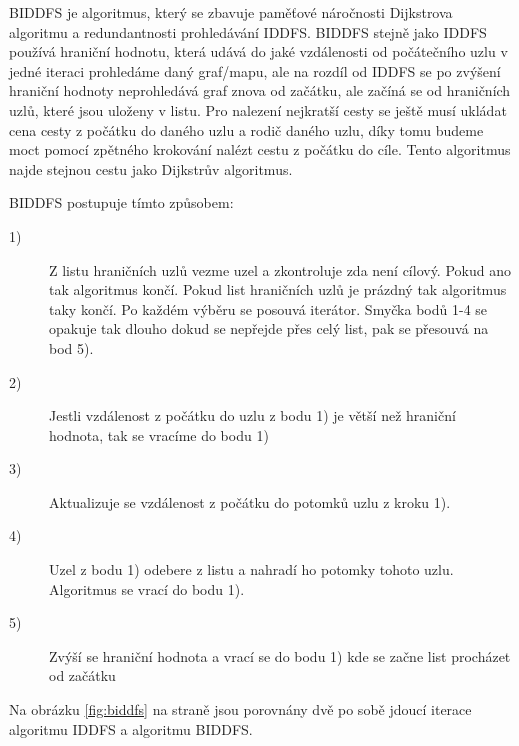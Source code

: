 \documentclass[12pt]{report}
\begin{document}
	BIDDFS je algoritmus, který se zbavuje paměťové náročnosti Dijkstrova algoritmu a redundantnosti prohledávání IDDFS. BIDDFS stejně jako IDDFS používá hraniční hodnotu, která udává do jaké vzdálenosti od počátečního uzlu v jedné iteraci prohledáme daný graf/mapu, ale na rozdíl od IDDFS se po zvýšení hraniční hodnoty neprohledává graf znova od začátku, ale začíná se od hraničních uzlů, které jsou uloženy v listu. Pro nalezení nejkratší cesty se ještě musí ukládat cena cesty z počátku do daného uzlu a rodič daného uzlu, díky tomu budeme moct pomocí zpětného krokování nalézt cestu z počátku do cíle. Tento algoritmus najde stejnou cestu jako Dijkstrův algoritmus.
	
	BIDDFS postupuje tímto způsobem:
	
	\begin{description}
		\item[1)] Z listu hraničních uzlů vezme uzel a zkontroluje zda není cílový.  Pokud ano tak algoritmus končí. Pokud list hraničních uzlů je prázdný tak algoritmus taky končí. Po každém výběru se posouvá iterátor. Smyčka bodů 1-4 se opakuje tak dlouho dokud se nepřejde přes celý list, pak se přesouvá na bod 5).
		\item[2)] Jestli vzdálenost z počátku do uzlu z bodu 1) je větší než hraniční hodnota, tak se vracíme do bodu 1)
		\item[3)] Aktualizuje se vzdálenost z počátku do potomků uzlu z kroku 1).
		\item[4)] Uzel z bodu 1) odebere z listu a nahradí ho potomky tohoto uzlu. Algoritmus se vrací do bodu 1).
		\item[5)] Zvýší se hraniční hodnota a vrací se do bodu 1) kde se začne list procházet od začátku
	\end{description}
	
	
	
	Na obrázku \ref{fig:biddfs} na straně \pageref{fig:biddfs} jsou porovnány dvě po sobě jdoucí iterace algoritmu IDDFS a algoritmu BIDDFS.
	
	\newpage
	
\end{document}
